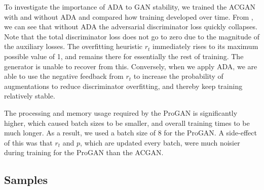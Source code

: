 To investigate the importance of ADA to GAN stability, we trained the ACGAN with and without ADA and compared how training developed over time.
From , we can see that without ADA the adversarial discriminator loss quickly collapses.
Note that the total discriminator loss does not go to zero due to the magnitude of the auxiliary losses.
The overfitting heuristic $r_t$ immediately rises to its maximum possible value of 1, and remains there for essentially the rest of training.
The generator is unable to recover from this.
Conversely, when we apply ADA, we are able to use the negative feedback from $r_t$ to increase the probability of augmentations to reduce discriminator overfitting, and thereby keep training relatively stable.

The processing and memory usage required by the ProGAN is significantly higher, which caused batch sizes to be smaller, and overall training times to be much longer.
As a result, we used a batch size of 8 for the ProGAN.
A side-effect of this was that $r_t$ and $p$, which are updated every batch, were much noisier during training for the ProGAN than the ACGAN.

\subsection{Samples}

